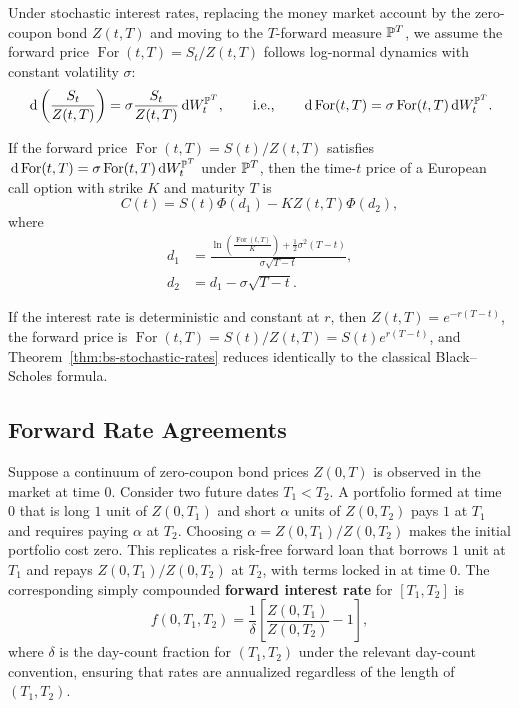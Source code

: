 Under stochastic interest rates, replacing the money market account by the zero-coupon bond $Z(t, T)$ and moving to the $T$-forward measure $\mathbb{P}^T$, we assume the forward price $\operatorname{For}(t, T) = S_t / Z(t, T)$ follows log-normal dynamics with constant volatility $\sigma$:
\[
\,\mathrm{d}\left(\frac{S_t}{Z(t, T)}\right) = \sigma \frac{S_t}{Z(t, T)}\,\mathrm{d} W_t^{\mathbb{P}^T}, \qquad \text{i.e.,} \qquad \,\mathrm{d}\operatorname{For}(t, T) = \sigma\operatorname{For}(t, T)\,\mathrm{d} W_t^{\mathbb{P}^T}.
\]
\begin{theorem}\label{thm:bs-stochastic-rates}
    If the forward price $\operatorname{For}(t, T) = S(t)/Z(t, T)$ satisfies $\,\mathrm{d}\operatorname{For}(t, T) = \sigma\operatorname{For}(t, T)\,\mathrm{d} W_t^{\mathbb{P}^T}$ under $\mathbb{P}^T$, then the time-$t$ price of a European call option with strike $K$ and maturity $T$ is
    \[
    C(t) = S(t)\Phi(d_1) - K Z(t, T)\Phi(d_2),
    \]
    where
    \begin{align*}
    d_1 &= \frac{\ln\!\left(\frac{\operatorname{For}(t, T)}{K}\right) + \frac{1}{2}\sigma^2(T - t)}{\sigma\sqrt{T - t}}, \\
    d_2 &= d_1 - \sigma\sqrt{T - t}.
    \end{align*}
\end{theorem}
\begin{note}
    If the interest rate is deterministic and constant at $r$, then $Z(t, T) = e^{-r(T - t)}$, the forward price is $\operatorname{For}(t, T) = S(t)/Z(t, T) = S(t) e^{r(T - t)}$, and Theorem~\ref{thm:bs-stochastic-rates} reduces identically to the classical Black--Scholes formula.
\end{note}

\subsection*{Forward Rate Agreements}
Suppose a continuum of zero-coupon bond prices $Z(0, T)$ is observed in the market at time $0$. Consider two future dates $T_1 < T_2$. A portfolio formed at time $0$ that is long $1$ unit of $Z(0, T_1)$ and short $\alpha$ units of $Z(0, T_2)$ pays $1$ at $T_1$ and requires paying $\alpha$ at $T_2$. Choosing $\alpha = Z(0, T_1)/Z(0, T_2)$ makes the initial portfolio cost zero. This replicates a risk-free forward loan that borrows $1$ unit at $T_1$ and repays $Z(0, T_1)/Z(0, T_2)$ at $T_2$, with terms locked in at time $0$. The corresponding simply compounded \textbf{forward interest rate} for $[T_1, T_2]$ is
\[
f(0, T_1, T_2) = \frac{1}{\delta}\left[\frac{Z(0, T_1)}{Z(0, T_2)} - 1\right],
\]
where $\delta$ is the day-count fraction for $(T_1, T_2)$ under the relevant day-count convention, ensuring that rates are annualized regardless of the length of $(T_1, T_2)$.

